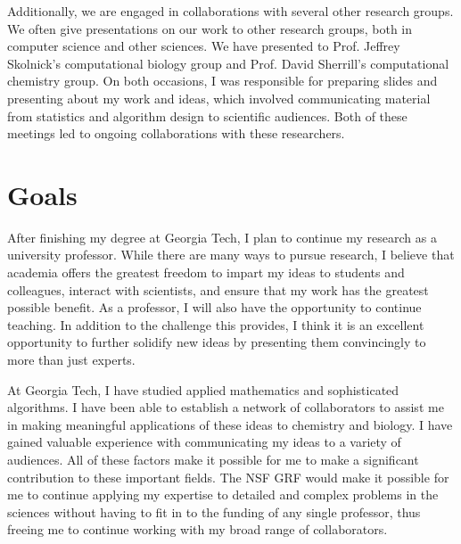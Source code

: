 \documentclass[twoside,leqno, 12pt]{article}
\begin{document}
Additionally, we are engaged in collaborations with several other research groups.  We often give presentations on our work to other research groups, both in computer science and other sciences.  We have presented to Prof. Jeffrey Skolnick's computational biology group and Prof. David Sherrill's computational chemistry group.  On both occasions, I was responsible for preparing slides and presenting about my work and ideas, which involved communicating material from statistics and algorithm design to scientific audiences.  Both of these meetings led to ongoing collaborations with these researchers.







\section{Goals}

After finishing my degree at Georgia Tech, I plan to continue my research as a university professor.  While there are many ways to pursue research, I believe that academia offers the greatest freedom to impart my ideas to students and colleagues, interact with scientists, and ensure that my work has the greatest possible benefit.  As a professor, I will also have the opportunity to continue teaching.  In addition to the challenge this provides, I think it is an excellent opportunity to further solidify new ideas by presenting them convincingly to more than just experts.  

At Georgia Tech, I have studied applied mathematics and sophisticated algorithms.  I have been able to establish a network of collaborators to assist me in making meaningful applications of these ideas to chemistry and biology.  I have gained valuable experience with communicating my ideas to a variety of audiences.  All of these factors make it possible for me to make a significant contribution to these important fields.  The NSF GRF would make it possible for me to continue applying my expertise to detailed and complex problems in the sciences without having to fit in to the funding of any single professor, thus freeing me to continue working with my broad range of collaborators.
\end{document}

